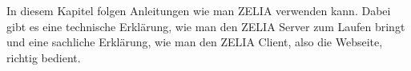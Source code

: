 

In diesem Kapitel folgen Anleitungen wie man ZELIA verwenden kann. Dabei gibt es eine technische Erklärung, wie man den ZELIA Server zum Laufen bringt und eine sachliche Erklärung, wie man den ZELIA Client, also die Webseite, richtig bedient.





